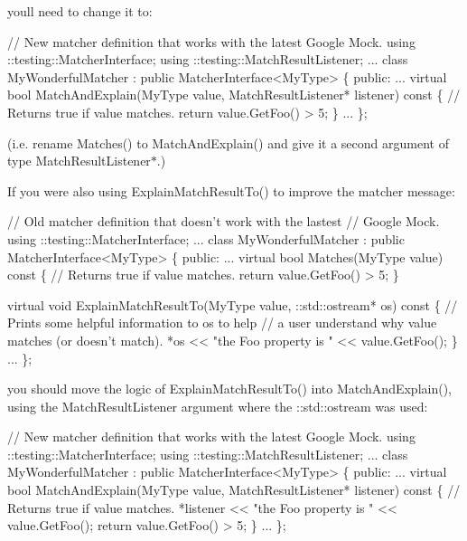 you\textquotesingle{}ll need to change it to\+: 
\begin{DoxyCode}
\textcolor{comment}{// New matcher definition that works with the latest Google Mock.}
using ::testing::MatcherInterface;
using ::testing::MatchResultListener;
...
class MyWonderfulMatcher : \textcolor{keyword}{public} MatcherInterface<MyType> \{
 \textcolor{keyword}{public}:
  ...
  \textcolor{keyword}{virtual} \textcolor{keywordtype}{bool} MatchAndExplain(MyType value,
                               MatchResultListener* listener)\textcolor{keyword}{ const }\{
    \textcolor{comment}{// Returns true if value matches.}
    \textcolor{keywordflow}{return} value.GetFoo() > 5;
  \}
  ...
\};
\end{DoxyCode}
 (i.\+e. rename {\ttfamily Matches()} to {\ttfamily Match\+And\+Explain()} and give it a second argument of type {\ttfamily Match\+Result\+Listener$\ast$}.)

If you were also using {\ttfamily Explain\+Match\+Result\+To()} to improve the matcher message\+: 
\begin{DoxyCode}
\textcolor{comment}{// Old matcher definition that doesn't work with the lastest}
\textcolor{comment}{// Google Mock.}
using ::testing::MatcherInterface;
...
class MyWonderfulMatcher : \textcolor{keyword}{public} MatcherInterface<MyType> \{
 \textcolor{keyword}{public}:
  ...
  \textcolor{keyword}{virtual} \textcolor{keywordtype}{bool} Matches(MyType value)\textcolor{keyword}{ const }\{
    \textcolor{comment}{// Returns true if value matches.}
    \textcolor{keywordflow}{return} value.GetFoo() > 5;
  \}

  \textcolor{keyword}{virtual} \textcolor{keywordtype}{void} ExplainMatchResultTo(MyType value,
                                    ::std::ostream* os)\textcolor{keyword}{ const }\{
    \textcolor{comment}{// Prints some helpful information to os to help}
    \textcolor{comment}{// a user understand why value matches (or doesn't match).}
    *os << \textcolor{stringliteral}{"the Foo property is "} << value.GetFoo();
  \}
  ...
\};
\end{DoxyCode}


you should move the logic of {\ttfamily Explain\+Match\+Result\+To()} into {\ttfamily Match\+And\+Explain()}, using the {\ttfamily Match\+Result\+Listener} argument where the {\ttfamily \+::std\+::ostream} was used\+: 
\begin{DoxyCode}
\textcolor{comment}{// New matcher definition that works with the latest Google Mock.}
using ::testing::MatcherInterface;
using ::testing::MatchResultListener;
...
class MyWonderfulMatcher : \textcolor{keyword}{public} MatcherInterface<MyType> \{
 \textcolor{keyword}{public}:
  ...
  \textcolor{keyword}{virtual} \textcolor{keywordtype}{bool} MatchAndExplain(MyType value,
                               MatchResultListener* listener)\textcolor{keyword}{ const }\{
    \textcolor{comment}{// Returns true if value matches.}
    *listener << \textcolor{stringliteral}{"the Foo property is "} << value.GetFoo();
    \textcolor{keywordflow}{return} value.GetFoo() > 5;
  \}
  ...
\};
\end{DoxyCode}


